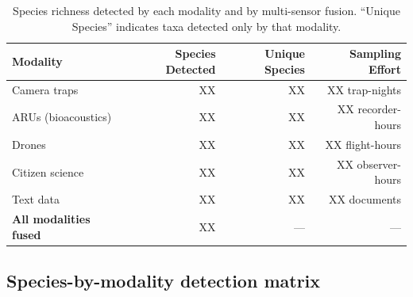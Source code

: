 \documentclass[12pt]{article}
\begin{document}
{%

\begin{table}[h]
\centering
\begin{tabular}{lrrr}
\toprule
\textbf{Modality} & \textbf{Species Detected} & \textbf{Unique Species} & \textbf{Sampling Effort} \\
\midrule
Camera traps & XX & XX & XX trap-nights \\
ARUs (bioacoustics) & XX & XX & XX recorder-hours \\
Drones & XX & XX & XX flight-hours \\
Citizen science & XX & XX & XX observer-hours \\
Text data & XX & XX & XX documents \\
\midrule
\textbf{All modalities fused} & XX & --- & --- \\
\bottomrule
\end{tabular}
\caption{Species richness detected by each modality and by multi-sensor fusion. ``Unique Species'' indicates taxa detected only by that modality.}
\label{table:richness}
\end{table}


\subsection{Species-by-modality detection matrix}



}
\end{document}
